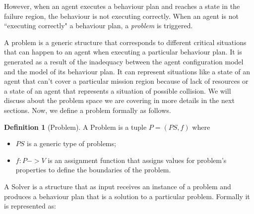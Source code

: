 \documentclass[journal]{IEEEtran}
\theoremstyle{definition}
\newtheorem{definition}{Definition}
\begin{document}


However, when an agent executes a behaviour plan and reaches a state in the failure region, the behaviour is not executing correctly. When an agent is not ``executing correctly" a behaviour plan, a \textit{problem} is triggered.

A problem is a generic structure that corresponds to different critical situations that can happen to an agent when executing a particular behaviour plan. It is generated as a result of the inadequacy between the agent configuration model and the model of its behaviour plan. It can represent situations like a state of an agent that can't cover a particular mission region because of lack of resources or a state of an agent that represents a situation of possible collision.
We will discuss about the problem space  we are covering in more details in the next sections. Now, we define a problem formally as follows.


\begin{definition}[Problem]
A Problem is a tuple $P= (PS, f)$ where 
\begin{itemize}
\item $PS$ is a generic type of problems;
\item  $f: P ->  V$ is an assignment function that assigns values for problem's properties to define the boundaries of the problem.
\end{itemize}
\end{definition}






A Solver is a structure that as input receives an instance of a problem and produces a behaviour plan that is a solution to a particular problem. Formally it is represented as:
\end{document}
